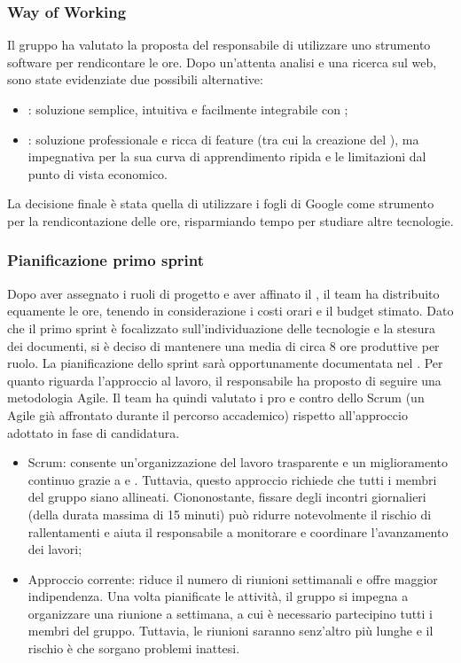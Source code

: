 \subsubsection{Way of Working}
Il gruppo ha valutato la proposta del responsabile di utilizzare uno strumento software per rendicontare le ore. Dopo un'attenta analisi e una ricerca sul web, sono state evidenziate due possibili alternative:
\begin{itemize}
	\item {}: soluzione semplice, intuitiva e facilmente integrabile con ;
	\item {}: soluzione professionale e ricca di feature (tra cui la creazione del ), ma impegnativa per la sua curva di apprendimento ripida e le limitazioni dal punto di vista economico.
\end{itemize}
La decisione finale è stata quella di utilizzare i fogli di Google come strumento per la rendicontazione delle ore, risparmiando tempo per studiare altre tecnologie. 

\subsubsection{Pianificazione primo sprint}
Dopo aver assegnato i ruoli di progetto e aver affinato il \WoW, il team ha distribuito equamente le ore, tenendo in considerazione i costi orari e il budget stimato. Dato che il primo sprint è focalizzato sull'individuazione delle tecnologie e la stesura dei documenti, si è deciso di mantenere una media di circa 8 ore produttive per ruolo. La pianificazione dello sprint sarà opportunamente documentata nel \PdP. Per quanto riguarda l'approccio al lavoro, il responsabile ha proposto di seguire una metodologia Agile. Il team ha quindi valutato i pro e contro dello Scrum (un  Agile già affrontato durante il percorso accademico) rispetto all'approccio adottato in fase di candidatura.
\begin{itemize}
	\item Scrum: consente un'organizzazione del lavoro trasparente e un miglioramento continuo grazie a  e . Tuttavia, questo approccio richiede che tutti i membri del gruppo siano allineati. Ciononostante, fissare degli incontri giornalieri (della durata massima di 15 minuti) può ridurre notevolmente il rischio di rallentamenti e aiuta il responsabile a monitorare e coordinare l'avanzamento dei lavori;
	\item Approccio corrente: riduce il numero di riunioni settimanali e offre maggior indipendenza. Una volta pianificate le attività, il gruppo si impegna a organizzare una riunione a settimana, a cui è necessario partecipino tutti i membri del gruppo. Tuttavia, le riunioni saranno senz'altro più lunghe e il rischio è che sorgano problemi inattesi.
\end{itemize}

